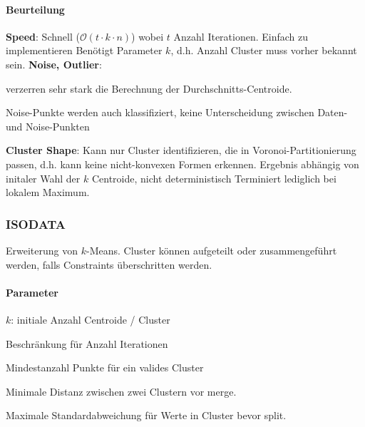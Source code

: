\documentclass[10pt]{article} %
\begin{document}
\paragraph{Beurteilung}
\begin{cptitemize} 
  	\advantageit \textbf{Speed}: Schnell ($\mathcal{O}(t \cdot k \cdot n)$) wobei $t$ Anzahl Iterationen.
  	\advantageit Einfach zu implementieren
  	\disadvantageit Benötigt Parameter $k$, d.h. Anzahl Cluster muss vorher bekannt sein.
  	\disadvantageit \textbf{Noise, Outlier}: 
  	\begin{cptitemize} 
  	 	 \item verzerren sehr stark die Berechnung der Durchschnitts-Centroide.
  	 	 \item Noise-Punkte werden auch klassifiziert, keine Unterscheidung zwischen
  	 	 	Daten- und Noise-Punkten
  	\end{cptitemize}
  	\disadvantageit \textbf{Cluster Shape}: Kann nur Cluster identifizieren, die in Voronoi-Partitionierung passen, d.h. kann keine nicht-konvexen Formen erkennen.
  	\disadvantageit Ergebnis abhängig von initaler Wahl der $k$ Centroide, nicht deterministisch
  	\disadvantageit Terminiert lediglich bei lokalem Maximum.
 \end{cptitemize}  


\subsubsection{ISODATA}
Erweiterung von $k$-Means. Cluster können aufgeteilt oder zusammengeführt
werden, falls Constraints überschritten werden.

\paragraph{Parameter}
\begin{cptitemize} 
  	 \item $k$: initiale Anzahl Centroide / Cluster
  	 \item {} Beschränkung für Anzahl Iterationen
  	 \item {} Mindestanzahl Punkte für ein valides Cluster
  	 \item {} Minimale Distanz zwischen zwei Clustern vor merge.
  	 \item {} Maximale Standardabweichung für Werte in Cluster bevor split.
 \end{cptitemize}  
\end{document}
